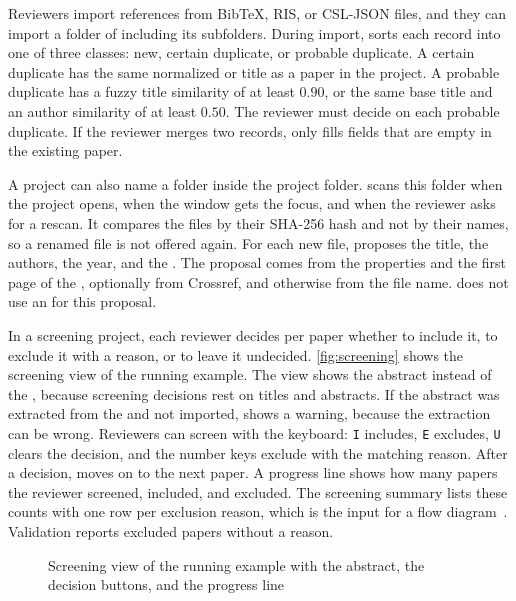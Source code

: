 Reviewers import references from BibTeX, RIS, or CSL-JSON files, and they can import a folder of \PDFs including its subfolders.
During import, \SaiLoR sorts each record into one of three classes: new, certain duplicate, or probable duplicate.
A certain duplicate has the same normalized \DOI or title as a paper in the project.
A probable duplicate has a fuzzy title similarity of at least $0.90$, or the same base title and an author similarity of at least $0.50$.
The reviewer must decide on each probable duplicate.
If the reviewer merges two records, \SaiLoR only fills fields that are empty in the existing paper.

A project can also name a \PDF folder inside the project folder.
\SaiLoR scans this folder when the project opens, when the window gets the focus, and when the reviewer asks for a rescan.
It compares the files by their SHA-256 hash and not by their names, so a renamed file is not offered again.
For each new file, \SaiLoR proposes the title, the authors, the year, and the \DOI.
The proposal comes from the properties and the first page of the \PDF, optionally from Crossref, and otherwise from the file name.
\SaiLoR does not use an \LLM for this proposal.

In a screening project, each reviewer decides per paper whether to include it, to exclude it with a reason, or to leave it undecided.
\autoref{fig:screening} shows the screening view of the running example.
The view shows the abstract instead of the \PDF, because screening decisions rest on titles and abstracts.
If the abstract was extracted from the \PDF and not imported, \SaiLoR shows a warning, because the extraction can be wrong.
Reviewers can screen with the keyboard: \texttt{I} includes, \texttt{E} excludes, \texttt{U} clears the decision, and the number keys exclude with the matching reason.
After a decision, \SaiLoR moves on to the next paper.
A progress line shows how many papers the reviewer screened, included, and excluded.
The screening summary lists these counts with one row per exclusion reason, which is the input for a \PRISMA flow diagram~\cite{page2021prisma}.
Validation reports excluded papers without a reason.

\begin{figure}[t]
    \centering
    \screenshot{\shotScreening}{\columnwidth}
    \caption{Screening view of the running example with the abstract, the decision buttons, and the progress line}
    \label{fig:screening}
\end{figure}

